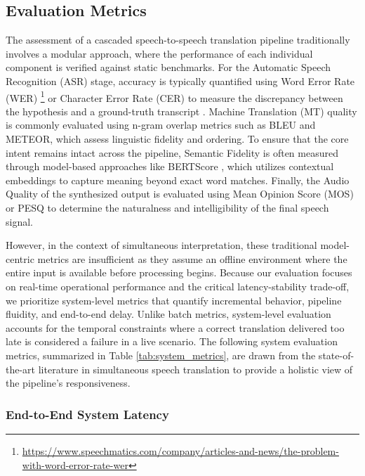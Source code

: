 \subsection{Evaluation Metrics}
\label{sec:evaluation_metrics}

The assessment of a cascaded speech-to-speech translation pipeline traditionally involves a modular approach, where the performance of each individual component is verified against static benchmarks. For the Automatic Speech Recognition (ASR) stage, accuracy is typically quantified using Word Error Rate (WER) \footnote{\url{https://www.speechmatics.com/company/articles-and-news/the-problem-with-word-error-rate-wer}} or Character Error Rate (CER) to measure the discrepancy between the hypothesis and a ground-truth transcript \cite{wer_definition_example}. Machine Translation (MT) quality is commonly evaluated using n-gram overlap metrics such as BLEU\cite{papineni2002bleu} and METEOR\cite{lavie2007meteor}, which assess linguistic fidelity and ordering. To ensure that the core intent remains intact across the pipeline, Semantic Fidelity is often measured through model-based approaches like BERTScore \cite{zhang2020bertscore}, which utilizes contextual embeddings to capture meaning beyond exact word matches. Finally, the Audio Quality of the synthesized output is evaluated using Mean Opinion Score (MOS) \cite{itutp8002} or PESQ \cite{rix2001perceptual} to determine the naturalness and intelligibility of the final speech signal.

However, in the context of simultaneous interpretation, these traditional model-centric metrics are insufficient as they assume an offline environment where the entire input is available before processing begins. Because our evaluation focuses on real-time operational performance and the critical latency-stability trade-off, we prioritize system-level metrics that quantify incremental behavior, pipeline fluidity, and end-to-end delay. Unlike batch metrics, system-level evaluation accounts for the temporal constraints where a correct translation delivered too late is considered a failure in a live scenario. The following system evaluation metrics, summarized in Table \ref{tab:system_metrics}, are drawn from the state-of-the-art literature in simultaneous speech translation to provide a holistic view of the pipeline's responsiveness.



\subsubsection{End-to-End System Latency}
\label{subsec:eval_e2e_latency}

